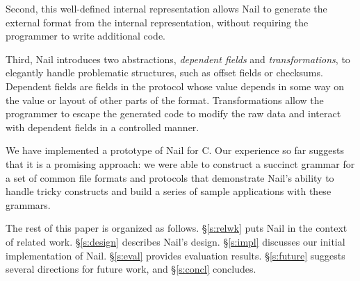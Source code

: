 Second, this well-defined internal representation allows Nail to generate the external format from
the internal representation, without requiring the programmer to write additional code.




Third, Nail introduces two abstractions, \emph{dependent fields} and \emph{transformations}, to
elegantly handle problematic structures, such as offset fields or checksums. Dependent fields are
fields in the protocol whose value depends in some way on the value or layout of other parts of the
format. Transformations allow the programmer to escape the generated code to modify the raw data and
interact with dependent fields in a controlled manner. 

We have implemented a prototype of Nail for C\@.  Our experience
so far suggests that it is a promising approach: we were able to construct
a succinct grammar for a set of common file formats and protocols that demonstrate Nail's ability to
handle tricky constructs and build a series of sample applications with these grammars. 

The rest of this paper is organized as follows.  \S\ref{s:relwk}
puts Nail in the context of related work.  \S\ref{s:design} describes
Nail's design.  \S\ref{s:impl} discusses our initial implementation
of Nail.  \S\ref{s:eval} provides evaluation results.
\S\ref{s:future} suggests several directions for future work, and
\S\ref{s:concl} concludes.

